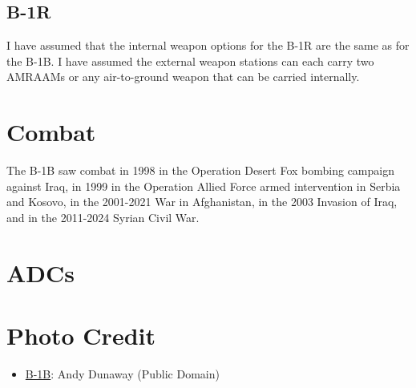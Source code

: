 \subsection{B-1R}

I have assumed that the internal weapon options for the B-1R are the same as for the B-1B. I have assumed the external weapon stations can each carry two AMRAAMs or any air-to-ground weapon that can be carried internally.

\section{Combat}

The B-1B saw combat in 1998 in the Operation Desert Fox bombing campaign against Iraq, in 1999 in the Operation Allied Force armed intervention in Serbia and Kosovo, in the 2001-2021 War in Afghanistan, in the 2003 Invasion of Iraq, and in the 2011-2024 Syrian Civil War.

\section{ADCs}
\begin{adclist}
\end{adclist}

\section{Photo Credit}
\begin{itemize}\raggedright
    \item \href{https://commons.wikimedia.org/wiki/File:B-1B.jpg}{B-1B}: Andy Dunaway (Public Domain)
\end{itemize}
